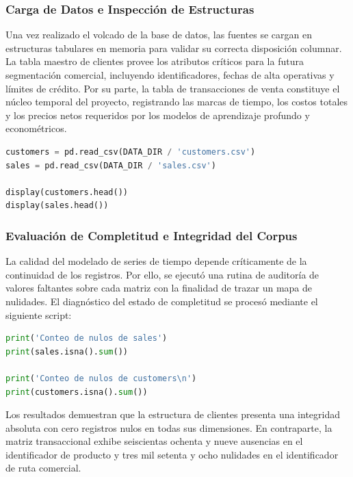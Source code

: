 \documentclass[11pt,a4paper]{report}
\begin{document}
        \subsubsection{Carga de Datos e Inspección de Estructuras}
        Una vez realizado el volcado de la base de datos, las fuentes se cargan en estructuras tabulares en memoria para validar su correcta disposición columnar.
        La tabla maestro de clientes provee los atributos críticos para la futura segmentación comercial, incluyendo identificadores, fechas de alta operativas y límites de crédito.
        Por su parte, la tabla de transacciones de venta constituye el núcleo temporal del proyecto, registrando las marcas de tiempo,
        los costos totales y los precios netos requeridos por los modelos de aprendizaje profundo y econométricos.

            \begin{lstlisting}[language=Python, caption=Lectura de los conjuntos de datos hacia estructuras tabulares.]
customers = pd.read_csv(DATA_DIR / 'customers.csv')
sales = pd.read_csv(DATA_DIR / 'sales.csv')

display(customers.head())
display(sales.head())
            \end{lstlisting}

        \subsubsection{Evaluación de Completitud e Integridad del Corpus}
        La calidad del modelado de series de tiempo depende críticamente de la continuidad de los registros.
        Por ello, se ejecutó una rutina de auditoría de valores faltantes sobre cada matriz con la finalidad de trazar un mapa de nulidades.
        El diagnóstico del estado de completitud se procesó mediante el siguiente script:

            \begin{lstlisting}[language=Python, caption=Auditoría de valores nulos en los conjuntos de datos.]
print('Conteo de nulos de sales')
print(sales.isna().sum())

print('Conteo de nulos de customers\n')
print(customers.isna().sum())
            \end{lstlisting}

        Los resultados demuestran que la estructura de clientes presenta una integridad absoluta con cero registros nulos en todas sus dimensiones.
        En contraparte, la matriz transaccional exhibe seiscientas ochenta y nueve ausencias en el identificador de producto y tres mil setenta
        y ocho nulidades en el identificador de ruta comercial. 
\end{document}
